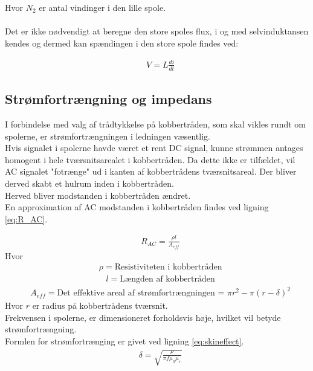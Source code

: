 Hvor $N_2$ er antal vindinger i den lille spole.
\\ \\
Det er ikke nødvendigt at beregne den store spoles flux, i og med selvinduktansen kendes og dermed kan spændingen i den store spole findes ved:

\begin{align}
	&V = L\frac{di}{dt} \label{eq:ldidt}
\end{align}

\subsection{Strømfortrængning  og impedans}\label{Sec_skineff.}
I forbindelse med valg af trådtykkelse på kobbertråden, som skal vikles rundt om spolerne, er strømfortrængningen i ledningen væsentlig.\\
Hvis signalet i spolerne havde været et rent DC signal, kunne strømmen antages homogent i hele tværsnitsarealet i kobbertråden.
Da dette ikke er tilfældet, vil AC signalet "fotrænge" ud i kanten af kobbertrådens tværsnitsareal. 
Der bliver derved skabt et hulrum inden i kobbertråden. \\
Herved bliver modstanden i kobbertråden ændret.\\
En approximation af AC modstanden i kobbertråden findes ved ligning \ref{eq:R_AC}.

\begin{align}
	& R_{AC}=\frac{\rho l}{A_{eff}} \label{eq:R_AC}
\end{align}
Hvor
\begin{align}
	& \rho = \text{Resistiviteten i kobbertråden} \nonumber
\end{align}
\begin{align}
	& l = \text{Længden af kobbertråden} \nonumber
\end{align}
\begin{align}
	& A_{eff} = \text{Det effektive areal af strømfortrængningen = $\pi r^2-\pi(r-\delta)^2$} \nonumber
\end{align}
Hvor $r$ er radius på kobbertrådens tværsnit.\\	
Frekvensen i spolerne, er dimensioneret forholdsvis høje, hvilket vil betyde strømfortrængning.  \\
Formlen for strømfortrænging er givet ved ligning \ref{eq:skineffect}.
\begin{align}
	& \delta = \sqrt{\frac{\rho}{\pi f\mu_0\mu_r}} \label{eq:skineffect}
\end{align}

